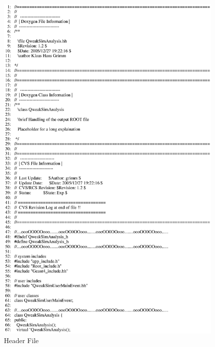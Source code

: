 \clearpage

\begin{figure}[h]
  \hspace{0cm}
  \includegraphics[scale=0.8]{./figures13/QweakSimAnalysis.hh-p1.eps}
  \caption{Header File}
           \label{fig:XIII-SC-1}
\end{figure}

\clearpage

